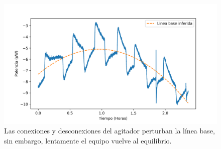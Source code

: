 	\begin{figure}[h]
		\centering
		\includegraphics[width=\linewidth]{../Data/Baselines/motor}
		\caption{Las conexiones y desconexiones del agitador perturban la línea base, sin embargo, lentamente el equipo vuelve al equilibrio.}
		\label{fig: connection}
	\end{figure}
	


		